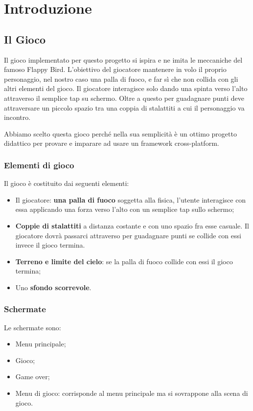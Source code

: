 \section{Introduzione}

	\subsection{Il Gioco}
		Il gioco implementato per questo progetto si ispira e ne imita le meccaniche del famoso  Flappy Bird. L'obiettivo del giocatore mantenere in volo il proprio personaggio, nel nostro caso una palla di fuoco, e far sì che non collida con gli altri elementi del gioco. Il giocatore interagisce solo dando una spinta verso l'alto attraverso il semplice tap su schermo. Oltre a questo per guadagnare punti deve attraversare un piccolo spazio tra una coppia di stalattiti a cui il personaggio va incontro.
		
		Abbiamo scelto questa gioco perché nella sua semplicità è un ottimo progetto didattico per provare e imparare ad usare un framework cross-platform.
			
		\subsubsection{Elementi di gioco}
			Il gioco è costituito dai seguenti elementi:
			\begin{itemize}
				\item Il giocatore: \textbf{una palla di fuoco} soggetta alla fisica, l'utente interagisce con essa applicando una forza verso l'alto con un semplice tap sullo schermo;
				\item \textbf{Coppie di stalattiti} a distanza costante e con uno spazio fra esse casuale. Il giocatore dovrà passarci attraverso per guadagnare punti se collide con essi invece il gioco termina.
				\item \textbf{Terreno e limite del cielo}: se la palla di fuoco collide con essi il gioco termina;
				\item Uno \textbf{sfondo scorrevole}.
			\end{itemize}
		
		\subsubsection{Schermate}
			Le schermate sono:
			\begin{itemize}
				\item Menu principale;
				\item Gioco;
				\item Game over;
				\item Menu di gioco: corrisponde al menu principale ma si sovrappone alla scena di gioco.
			\end{itemize}
		
